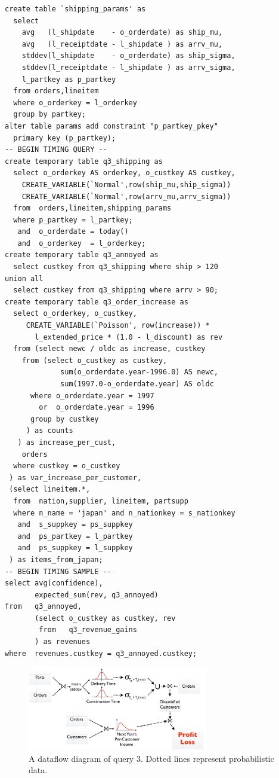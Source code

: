 

\begin{footnotesize}
\begin{verbatim}
create table `shipping_params' as
  select 
    avg   (l_shipdate    - o_orderdate) as ship_mu,
    avg   (l_receiptdate - l_shipdate ) as arrv_mu,
    stddev(l_shipdate    - o_orderdate) as ship_sigma,
    stddev(l_receiptdate - l_shipdate ) as arrv_sigma,
    l_partkey as p_partkey
  from orders,lineitem
  where o_orderkey = l_orderkey
  group by partkey;
alter table params add constraint "p_partkey_pkey" 
  primary key (p_partkey);
-- BEGIN TIMING QUERY --
create temporary table q3_shipping as
  select o_orderkey AS orderkey, o_custkey AS custkey,
    CREATE_VARIABLE(`Normal',row(ship_mu,ship_sigma))
    CREATE_VARIABLE(`Normal',row(arrv_mu,arrv_sigma))
  from  orders,lineitem,shipping_params
  where p_partkey = l_partkey;
   and  o_orderdate = today()
   and  o_orderkey  = l_orderkey;
create temporary table q3_annoyed as
  select custkey from q3_shipping where ship > 120
union all
  select custkey from q3_shipping where arrv > 90;
create temporary table q3_order_increase as
  select o_orderkey, o_custkey,
     CREATE_VARIABLE(`Poisson', row(increase)) *
       l_extended_price * (1.0 - l_discount) as rev
  from (select newc / oldc as increase, custkey 
    from (select o_custkey as custkey, 
             sum(o_orderdate.year-1996.0) AS newc,
             sum(1997.0-o_orderdate.year) AS oldc
      where o_orderdate.year = 1997 
        or  o_orderdate.year = 1996
      group by custkey
     ) as counts
   ) as increase_per_cust,
    orders
  where custkey = o_custkey
 ) as var_increase_per_customer,
 (select lineitem.*,
  from  nation,supplier, lineitem, partsupp
  where n_name = 'japan' and n_nationkey = s_nationkey
   and  s_suppkey = ps_suppkey
   and  ps_partkey = l_partkey
   and  ps_suppkey = l_suppkey
 ) as items_from_japan;
-- BEGIN TIMING SAMPLE --
select avg(confidence),
       expected_sum(rev, q3_annoyed)
from   q3_annoyed,
       (select o_custkey as custkey, rev
        from   q3_revenue_gains
       ) as revenues
where  revenues.custkey = q3_annoyed.custkey;
\end{verbatim}
\end{footnotesize}

\begin{figure}
\begin{center}
\includegraphics[width=3.1in]{graphics/query3.pdf}
\caption{A dataflow diagram of query 3.  Dotted lines represent probabilistic data.}
\label{fig:query3dataflow}
\end{center}
\end{figure}

